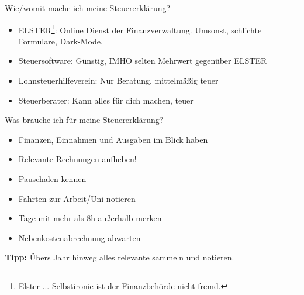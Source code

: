 \documentclass{beamer}
\begin{document}
			\begin{frame}{Wie/womit mache ich meine Steuererklärung?}
				\begin{itemize}
					\item ELSTER\footnote{Elster ... Selbstironie ist der Finanzbehörde nicht fremd.}: Online Dienst der Finanzverwaltung. Umsonst, schlichte Formulare, Dark-Mode.
					\item Steuersoftware: Günstig, IMHO selten Mehrwert gegenüber ELSTER
					\item Lohnsteuerhilfeverein: Nur Beratung, mittelmäßig teuer
					\item Steuerberater: Kann alles für dich machen, teuer
				\end{itemize}
			\end{frame}
		
			\begin{frame}{Was brauche ich für meine Steuererklärung?}
				\begin{itemize}
					\item Finanzen, Einnahmen und Ausgaben im Blick haben
					\item Relevante Rechnungen aufheben!
					\item Pauschalen kennen
					\item Fahrten zur Arbeit/Uni notieren
					\item Tage mit mehr als 8h außerhalb merken
					\item Nebenkostenabrechnung abwarten
				\end{itemize}\n
				\textbf{Tipp:} Übers Jahr hinweg alles relevante sammeln und notieren.
			\end{frame}
			
			
\end{document}
